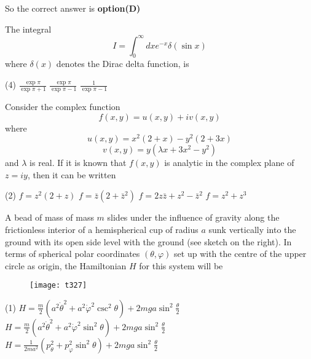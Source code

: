 \begin{questions}
\begin{tasks}
\end{tasks}
\begin{answer}
	So the correct answer is \textbf{option(D)}
\end{answer}
\begin{minipage}{\textwidth}
	\question The integral
	$$
	I=\int_{0}^{\infty} d x e^{-x} \delta(\sin x)
	$$
	where $\delta(x)$ denotes the Dirac delta function, is
\end{minipage}
\begin{tasks}(4)
	\task[\textbf{B.}] $\frac{\exp \pi}{\exp \pi+1}$
	\task[\textbf{C.}] $\frac{\exp \pi}{\exp \pi-1}$
	\task[\textbf{D.}] $\frac{1}{\exp \pi-1}$
\end{tasks}
\begin{minipage}{\textwidth}
	\question Consider the complex function
	$$
	f(x, y)=u(x, y)+i v(x, y)
	$$
	where
	$$
	u(x, y)=x^{2}(2+x)-y^{2}(2+3 x)
	$$
	$$
	v(x, y)=y\left(\lambda x+3 x^{2}-y^{2}\right)
	$$
	and $\lambda$ is real. If it is known that $f(x, y)$ is analytic in the complex plane of $z=i y$, then it can be written
\end{minipage}
\begin{tasks}(2)
	\task[\textbf{A.}] $f=z^{2}(2+z)$
	\task[\textbf{B.}] $f=\bar{z}\left(2+\bar{z}^{2}\right)$
	\task[\textbf{C.}]   $f=2 z \bar{z}+z^{2}-\bar{z}^{2}$
	\task[\textbf{D.}] $f=z^{2}+z^{3}$
\end{tasks}
\begin{minipage}{\textwidth}
	\question A bead of mass of mass $m$ slides under the influence of gravity along the frictionless interior of a hemispherical cup of radius $a$ sunk vertically into the ground with its open side level with the ground (see sketch on the right). In terms of spherical polar coordinates $(\theta, \varphi)$ set up with the centre of the upper circle as origin, the Hamiltonian $H$ for this system will be
\end{minipage}
\begin{figure}[H]
	\centering
	\texttt{[image: t327]}
\end{figure}
\begin{tasks}(1)
	\task[\textbf{A.}]   $H=\frac{m}{2}\left(a^{2} \dot{\theta}^{2}+a^{2} \dot{\varphi}^{2} \csc ^{2} \theta\right)+2 m g a \sin ^{2} \frac{\theta}{2}$
	\task[\textbf{B.}] $H=\frac{m}{2}\left(a^{2} \dot{\theta}^{2}+a^{2} \dot{\varphi}^{2} \sin ^{2} \theta\right)+2 m g a \sin ^{2} \frac{\theta}{2}$
	\task[\textbf{C.}]   $H=\frac{1}{2 m a^{2}}\left(p_{\theta}^{2}+p_{\varphi}^{2} \sin ^{2} \theta\right)+2 m g a \sin ^{2} \frac{\theta}{2}$

\end{tasks}
\end{questions}
